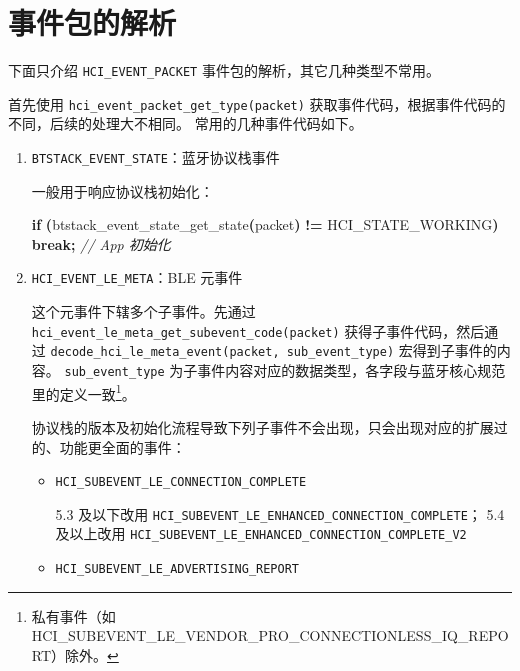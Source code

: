 \documentclass[
  12pt,
]{book}
\newenvironment{Shaded}{\begin{snugshade}}{\end{snugshade}}
\newcommand{\CommentTok}[1]{\textcolor[rgb]{0.56,0.35,0.01}{\textit{#1}}}
\newcommand{\ControlFlowTok}[1]{\textcolor[rgb]{0.13,0.29,0.53}{\textbf{#1}}}
\newcommand{\NormalTok}[1]{#1}
\newcommand{\OperatorTok}[1]{\textcolor[rgb]{0.81,0.36,0.00}{\textbf{#1}}}
\begin{document}
\hypertarget{ux4e8bux4ef6ux5305ux7684ux89e3ux6790}{%
\section{事件包的解析}\label{ux4e8bux4ef6ux5305ux7684ux89e3ux6790}}

下面只介绍 \texttt{HCI\_EVENT\_PACKET} 事件包的解析，其它几种类型不常用。

首先使用 \texttt{hci\_event\_packet\_get\_type(packet)} 获取事件代码，根据事件代码的不同，后续的处理大不相同。
常用的几种事件代码如下。

\begin{enumerate}
\def\labelenumi{\arabic{enumi}.}
\item
  \texttt{BTSTACK\_EVENT\_STATE}：蓝牙协议栈事件

  一般用于响应协议栈初始化：

\begin{Shaded}
\begin{Highlighting}[]
\ControlFlowTok{if} \OperatorTok{(}\NormalTok{btstack\_event\_state\_get\_state}\OperatorTok{(}\NormalTok{packet}\OperatorTok{)} \OperatorTok{!=}\NormalTok{ HCI\_STATE\_WORKING}\OperatorTok{)}
    \ControlFlowTok{break}\OperatorTok{;}
\CommentTok{// App 初始化}
\end{Highlighting}
\end{Shaded}
\item
  \texttt{HCI\_EVENT\_LE\_META}：BLE 元事件

  这个元事件下辖多个子事件。先通过 \texttt{hci\_event\_le\_meta\_get\_subevent\_code(packet)} 获得子事件代码，然后通过
  \texttt{decode\_hci\_le\_meta\_event(packet,\ sub\_event\_type)} 宏得到子事件的内容。
  \texttt{sub\_event\_type} 为子事件内容对应的数据类型，各字段与蓝牙核心规范里的定义一致\footnote{私有事件（如 HCI\_SUBEVENT\_LE\_VENDOR\_PRO\_CONNECTIONLESS\_IQ\_REPORT）除外。}。

  协议栈的版本及初始化流程导致下列子事件不会出现，只会出现对应的扩展过的、功能更全面的事件：

  \begin{itemize}
  \item
    \texttt{HCI\_SUBEVENT\_LE\_CONNECTION\_COMPLETE}

    5.3 及以下改用 \texttt{HCI\_SUBEVENT\_LE\_ENHANCED\_CONNECTION\_COMPLETE}；
    5.4 及以上改用 \texttt{HCI\_SUBEVENT\_LE\_ENHANCED\_CONNECTION\_COMPLETE\_V2}
  \item
    \texttt{HCI\_SUBEVENT\_LE\_ADVERTISING\_REPORT}


\end{itemize}
\end{enumerate}
\end{document}
